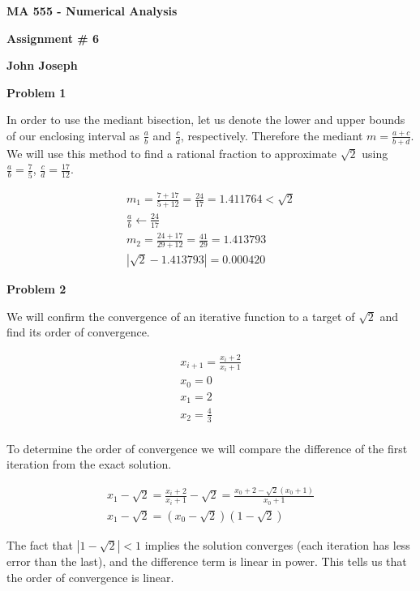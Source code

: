 \documentclass[a4paper,12pt]{article}
\begin{document}
\begin{center}

{\Large\bf MA 555 - Numerical Analysis}

\bigskip

{\large\bf Assignment \# 6}
\smallskip

{\large\bf John Joseph}
\end{center}

{\bf Problem 1}
\smallskip

In order to use the mediant bisection, let us denote the lower and upper bounds of our enclosing interval as $\frac{a}{b}$ and $\frac{c}{d}$, respectively. Therefore the mediant $m=\frac{a+c}{b+d}$. We will use this method to find a rational fraction to approximate $\sqrt{2}$ using $\frac{a}{b}=\frac{7}{5}$, $\frac{c}{d}=\frac{17}{12}$. 

\begin{eqnarray*}
m_1=\frac{7+17}{5+12}=\frac{24}{17}=1.411764 <  \sqrt{2} \\
\frac{a}{b} \leftarrow \frac{24}{17} \\
m_2=\frac{24+17}{29+12}=\frac{41}{29}=1.413793 \\
|\sqrt{2}-1.413793|=0.000420
\end{eqnarray*}

{\bf Problem 2}
\smallskip

We will confirm the convergence of an iterative function to a target of $\sqrt{2}$ and find its order of convergence. 

\begin{eqnarray*}
x_{i+1}=\frac{x_i+2}{x_i+1}\\
x_0=0 \\
x_1=2\\
x_2=\frac{4}{3}\\
\end{eqnarray*}

To determine the order of convergence we will compare the difference of the first iteration from the exact solution. 

\begin{eqnarray*}
x_1-\sqrt{2}=\frac{x_i+2}{x_i+1}-\sqrt{2}=\frac{x_0+2-\sqrt{2}(x_0+1)}{x_0+1} \\
x_1-\sqrt{2}=(x_0-\sqrt{2})(1-\sqrt{2})
\end{eqnarray*}

The fact that $|1-\sqrt{2}| < 1$ implies the solution converges (each iteration has less error than the last), and the difference term is linear in power. This tells us that the order of convergence is linear. 
\bigskip
\end{document}
